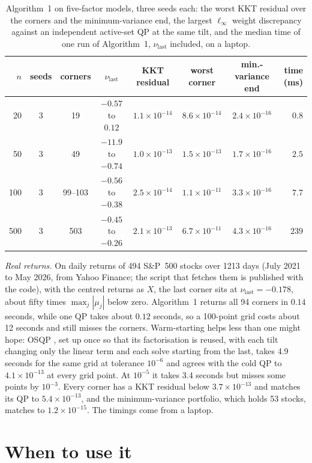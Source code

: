 \documentclass[11pt]{article}
\begin{document}
\begin{table}[t]
\centering
\small\setlength{\tabcolsep}{4.5pt}
\begin{tabular}{rccccccr}
\toprule
$n$ & seeds & corners & $\nu_{\mathrm{last}}$ & KKT residual & worst corner
& min.-variance end & time (ms)\\
\midrule
20 & 3 & 19 & $-0.57$ to $0.12$ & $1.1\times10^{-14}$ & $8.6\times10^{-14}$
& $2.4\times10^{-16}$ & $0.8$\\
50 & 3 & 49 & $-11.9$ to $-0.74$ & $1.0\times10^{-13}$ & $1.5\times10^{-13}$
& $1.7\times10^{-16}$ & $2.5$\\
100 & 3 & 99--103 & $-0.56$ to $-0.38$ & $2.5\times10^{-14}$ & $1.1\times10^{-11}$
& $3.3\times10^{-16}$ & $7.7$\\
500 & 3 & 503 & $-0.45$ to $-0.26$ & $2.1\times10^{-13}$ & $6.7\times10^{-11}$
& $4.3\times10^{-16}$ & $239$\\
\bottomrule
\end{tabular}
\caption{Algorithm~1 on five-factor models, three seeds each: the worst KKT residual over
the corners and the minimum-variance end, the largest $\ell_\infty$ weight discrepancy
against an independent active-set QP at the same tilt, and the median time of one run of
Algorithm~1, $\nu_{\mathrm{last}}$ included, on a laptop.}
\label{tab:robust}
\end{table}

\emph{Real returns.} On daily returns of 494 S\&P~500 stocks over 1213 days (July 2021
to May 2026, from Yahoo Finance; the script that fetches them is published with the code), with the centred returns as $X$, the last corner sits at
$\nu_{\mathrm{last}}=-0.178$, about fifty times $\max_j|\mu_j|$ below zero. Algorithm~1
returns all 94 corners in $0.14$ seconds, while one QP takes about $0.12$ seconds, so a
100-point grid costs about 12 seconds and still misses the corners. Warm-starting
helps less than one might hope: OSQP \cite{stellato2020}, set up once so that its
factorisation is reused, with each tilt changing only the linear term and each solve
starting from the last, takes 4.9 seconds for the same grid at tolerance $10^{-6}$ and
agrees with the cold QP to $4.1\times10^{-13}$ at every grid point. At $10^{-5}$ it takes
3.4 seconds but misses some points by $10^{-3}$. Every corner has a KKT
residual below $3.7\times10^{-13}$ and matches its QP to $5.4\times10^{-13}$, and the
minimum-variance portfolio, which holds 53 stocks, matches to $1.2\times10^{-15}$. The timings come from a laptop.

\section{When to use it}
\label{sec:scope}
\end{document}
